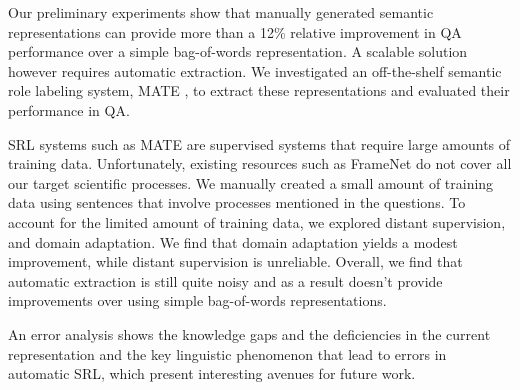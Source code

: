 Our preliminary experiments show that manually generated semantic representations can provide more than a 12\% relative improvement in QA performance over a simple bag-of-words representation.
A scalable solution however requires automatic extraction. 
We investigated an off-the-shelf semantic role labeling system, MATE \cite{bjorkelund2009multilingual}, to extract these representations and 
evaluated their performance in QA.

SRL systems such as MATE are supervised systems that require large amounts of training data. 
Unfortunately, existing resources such as FrameNet do not cover all our target scientific processes. 
We manually created a small amount of training data using sentences that involve processes mentioned in the questions. 
To account for the limited amount of training data, we explored distant supervision, and domain adaptation.
We find that domain adaptation yields a modest improvement, while distant supervision is unreliable. 
Overall, we find that automatic extraction is still quite noisy and as a result doesn't provide improvements over
using simple bag-of-words representations. 

An error analysis shows the knowledge gaps and the deficiencies in the current representation and the key linguistic
phenomenon that lead to errors in automatic SRL, which present interesting avenues for future work. 





